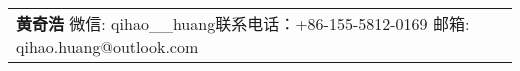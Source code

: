 \newcommand{\myheader}{
\begin{tabular*}{\textwidth}{l@{\extracolsep{\fill}}r}
  \specialrule{0em}{4pt}{4pt}
  \textbf{\huge 黄奇浩} \quad 微信: qihao\_\_huang\quad 联系电话：+86-155-5812-0169 \quad 邮箱: qihao.huang@outlook.com \\ 
  \end{tabular*}\\\vspace{0.1in}
  
  \vspace{0.1in}
}

\myheader

